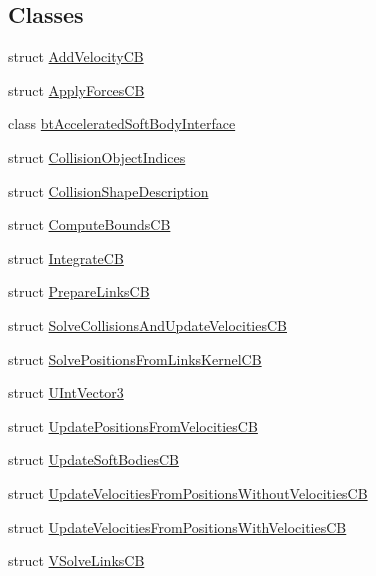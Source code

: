 \subsection*{Classes}
\begin{DoxyCompactItemize}
\item 
struct \hyperlink{structbtDX11SoftBodySolver_1_1AddVelocityCB}{Add\+Velocity\+CB}
\item 
struct \hyperlink{structbtDX11SoftBodySolver_1_1ApplyForcesCB}{Apply\+Forces\+CB}
\item 
class \hyperlink{classbtDX11SoftBodySolver_1_1btAcceleratedSoftBodyInterface}{bt\+Accelerated\+Soft\+Body\+Interface}
\item 
struct \hyperlink{structbtDX11SoftBodySolver_1_1CollisionObjectIndices}{Collision\+Object\+Indices}
\item 
struct \hyperlink{structbtDX11SoftBodySolver_1_1CollisionShapeDescription}{Collision\+Shape\+Description}
\item 
struct \hyperlink{structbtDX11SoftBodySolver_1_1ComputeBoundsCB}{Compute\+Bounds\+CB}
\item 
struct \hyperlink{structbtDX11SoftBodySolver_1_1IntegrateCB}{Integrate\+CB}
\item 
struct \hyperlink{structbtDX11SoftBodySolver_1_1PrepareLinksCB}{Prepare\+Links\+CB}
\item 
struct \hyperlink{structbtDX11SoftBodySolver_1_1SolveCollisionsAndUpdateVelocitiesCB}{Solve\+Collisions\+And\+Update\+Velocities\+CB}
\item 
struct \hyperlink{structbtDX11SoftBodySolver_1_1SolvePositionsFromLinksKernelCB}{Solve\+Positions\+From\+Links\+Kernel\+CB}
\item 
struct \hyperlink{structbtDX11SoftBodySolver_1_1UIntVector3}{U\+Int\+Vector3}
\item 
struct \hyperlink{structbtDX11SoftBodySolver_1_1UpdatePositionsFromVelocitiesCB}{Update\+Positions\+From\+Velocities\+CB}
\item 
struct \hyperlink{structbtDX11SoftBodySolver_1_1UpdateSoftBodiesCB}{Update\+Soft\+Bodies\+CB}
\item 
struct \hyperlink{structbtDX11SoftBodySolver_1_1UpdateVelocitiesFromPositionsWithoutVelocitiesCB}{Update\+Velocities\+From\+Positions\+Without\+Velocities\+CB}
\item 
struct \hyperlink{structbtDX11SoftBodySolver_1_1UpdateVelocitiesFromPositionsWithVelocitiesCB}{Update\+Velocities\+From\+Positions\+With\+Velocities\+CB}
\item 
struct \hyperlink{structbtDX11SoftBodySolver_1_1VSolveLinksCB}{V\+Solve\+Links\+CB}
\end{DoxyCompactItemize}
